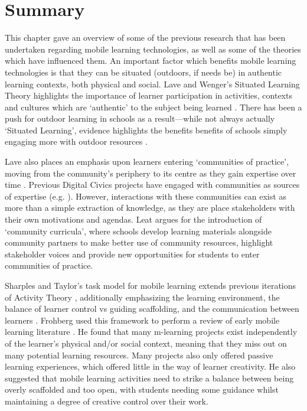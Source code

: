 \section{Summary}
This chapter gave an overview of some of the previous research that has been undertaken regarding mobile learning technologies, as well as some of the theories which have influenced them.
An important factor which benefits mobile learning technologies is that they can be situated (outdoors, if needs be) in authentic learning contexts, both physical and social. Lave and Wenger's Situated Learning Theory highlights the importance of learner participation in activities, contexts and cultures which are `authentic' to the subject being learned \citep{lave1991situated}. There has been a push for outdoor learning in schools as a result---while not always actually `Situated Learning', evidence highlights the benefits benefits of schools simply engaging more with outdoor resources \citep{Fiennes2015}.

Lave also places an emphasis upon learners entering `communities of practice', moving from the community's periphery to its centre as they gain expertise over time \citep{Lave1991}. Previous Digital Civics projects have engaged with communities as sources of expertise (e.g. \citep{Dodds2017, Rainey2019}). However, interactions with these communities can exist as more than a simple extraction of knowledge, as they are place stakeholders with their own motivations and agendas. Leat argues for the introduction of `community curricula', where schools develop learning materials alongside community partners to make better use of community resources, highlight stakeholder voices and provide new opportunities for students to enter communities of practice.

Sharples and Taylor's task model for mobile learning extends previous iterations of Activity Theory \citep{Engestrom2001}, additionally emphasizing the learning environment, the balance of learner control vs guiding scaffolding, and the communication between learners \citep{Sharples2007}. Frohberg used this framework to perform a review of early mobile learning literature \citep{Frohberg2009}. He found that many m-learning projects exist independently of the learner's physical and/or social context, meaning that they miss out on many potential learning resources. Many projects also only offered passive learning experiences, which offered little in the way of learner creativity. He also suggested that mobile learning activities need to strike a balance between being overly scaffolded and too open, with students needing some guidance whilst maintaining a degree of creative control over their work.

